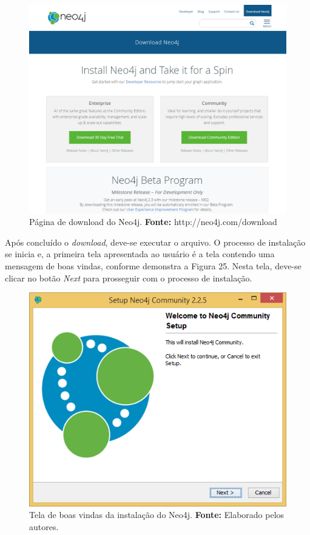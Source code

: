 \newpage
\begin{figure}[h!]
	\centerline{\includegraphics[scale=0.4]{./imagens/download-neo4j.png}}
	\caption[Página de download do Neo4j]
	{Página de download do Neo4j. \textbf{Fonte:} http://neo4j.com/download}
	\label{fig:exemplo1}
\end{figure}

\par Após concluído o \textit{download}, deve-se executar o arquivo. O processo de instalação se inicia e, a primeira tela apresentada ao usuário é a tela contendo uma mensagem de boas vindas, conforme demonstra a Figura 25. Nesta tela, deve-se clicar no botão \textit{Next} para prosseguir com o processo de instalação.

\begin{figure}[h!]
	\centerline{\includegraphics[scale=0.4]{./imagens/neo4j-install-step1.png}}
	\caption[Tela de boas vindas da instalação do Neo4j]
	{Tela de boas vindas da instalação do Neo4j. \textbf{Fonte:} Elaborado pelos autores.}
	\label{fig:exemplo1}
\end{figure}

